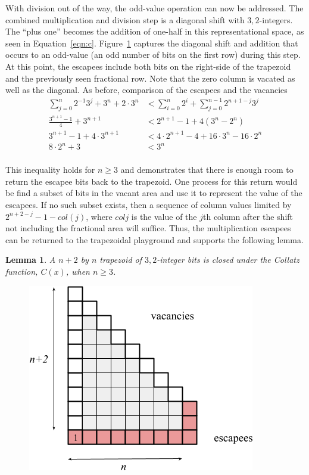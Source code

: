 \documentclass{article}
\newtheorem{lemma}{Lemma}
\begin{document}
With division out of the way, the odd-value operation can now be addressed. The combined
multiplication and division step is a diagonal shift with ${3,2}$-integers. The
``plus one'' becomes the addition of one-half in this representational
space, as seen in Equation~\ref{eqn:c}. Figure~\ref{fig:multiply} captures the diagonal shift and addition that
occurs to an odd-value (an odd number of bits on the first row) during this
step. At this point, the escapees include both bits on the right-side of
the trapezoid and the previously seen fractional row.  Note that the zero column is vacated as well as the diagonal. As before,
comparison of the escapees and the vacancies
\begin{align*}
  \sum_{j=0}^{n}2^{-1}3^j + 3^n + 2\cdot3^n &< \sum_{i=0}^{n}2^i + \sum_{j=0}^{n-1}2^{n+1-j}3^j \\
  \frac{3^{n+1}-1}{4} + 3^{n+1} &< 2^{n+1} - 1 + 4(3^n - 2^n) \\
  3^{n+1}-1 + 4\cdot3^{n+1} &< 4\cdot2^{n+1} - 4 + 16\cdot3^n - 16\cdot2^n \\
  8\cdot2^n + 3  &< 3^n  \\
\end{align*}

This inequality holds for $n \ge 3$ and demonstrates that there is enough room
to return the escapee bits back to the trapezoid. One process for this return
would be find a subset of bits in the vacant area and use it to represent the value
of the escapees. If no such subset exists, then a sequence of column values limited
by $2^{n+2-j}-1-col(j)$, where $col{j}$ is the value of the $j$th column after the shift
not including the fractional area will suffice. Thus, the multiplication escapees can be returned to
the trapezoidal playground and supports the following lemma.
\begin{lemma}
  A $n+2$ by $n$ trapezoid of ${3,2}$-integer bits is closed under the Collatz function, $C(x)$, when $n\ge3$.
  \label{lem:closure}
\end{lemma}


\begin{figure}[H]
  \begin{center}
    \includegraphics[scale=0.5]{"Images/multiply_bold"}
  \end{center}
  \label{fig:multiply}
\end{figure}
\end{document}
